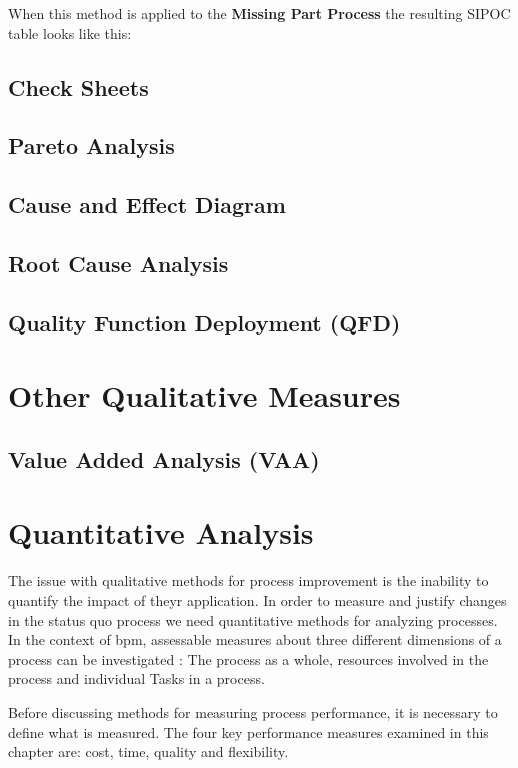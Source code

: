 When this method is applied to the \textbf{Missing Part Process} the resulting SIPOC table looks like this: 


\subsection{Check Sheets}

\subsection{Pareto Analysis}

\subsection{Cause and Effect Diagram}

\subsection{Root Cause Analysis}

\subsection{Quality Function Deployment (QFD)}

\section{Other Qualitative Measures}

\subsection{Value Added Analysis (VAA)}


\section{Quantitative Analysis}
The issue with qualitative methods for process improvement is the inability to quantify the impact of theyr application. In order to measure and justify changes in the status quo process we need quantitative methods for analyzing processes. In the context of \gls{bpm}, assessable measures about three different dimensions of a process can be investigated : The process as a whole, resources involved in the process and individual Tasks in a process. \cite{fundamentals}

Before discussing methods for measuring process performance, it is necessary to define what is measured. The four key performance measures examined in this chapter are: cost, time, quality and flexibility. \cite{fundamentals}

